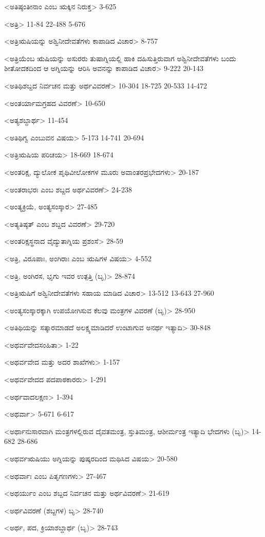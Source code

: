 <ಅತಿಷ್ಠಂತೀನಾಂ ಎಂಬ ಋಕ್ಕಿನ ನಿರುಕ್ತ>
3-625

<ಅತ್ರಿ>
11-84 
22-488 
5-676

<ಅತ್ರಿಋಷಿಯನ್ನು ಅಶ್ವಿನೀದೇವತೆಗಳು ಕಾಪಾಡಿದ ವಿಚಾರ>
8-757

<ಅತ್ರಿಯೆಂಬ ಋಷಿಯನ್ನು ಅಸುರರು ತುಷಾಗ್ನಿಯಲ್ಲಿ ಹಾಕಿ ದಹಿಸುತ್ತಿರುವಾಗ ಅಶ್ವಿನೀದೇವತೆಗಳು ಬಂದು ಶೀತೋದಕದಿಂದ ಆ ಅಗ್ನಿಯನ್ನು ಆರಿಸಿ ಅವನನ್ನು ಕಾಪಾಡಿದ ವಿಚಾರ>
9-222
20-143

<ಅತಿಥಿಶಬ್ದದ ನಿರ್ವಚನ ಮತ್ತು ಅರ್ಥವಿವರಣೆ>
10-304 
18-725 
20-533
14-472

<ಅಂತರ್ಯಾಮಗ್ರಹದ ವಿವರಣೆ>
10-650

<ಅತ್ಯಶಬ್ದಾರ್ಥ>
11-454

<ಅತಿಥಿಗ್ವ ಎಂಬುವನ ವಿಷಯ>
5-173 
14-741
20-694

<ಅತ್ರಿಋಷಿಯ ಪರಿಚಯ>
18-669
18-674

<ಅಂತರಿಕ್ಷ, ದ್ಯುಲೋಕ ಪೃಥಿವೀಲೋಕಗಳ ಮೂರು ಅವಾಂತರಪ್ರಭೇದಗಳು>
20-187

<ಅಂತರಾಭರಃ ಎಂಬ ಶಬ್ದದ ಅರ್ಥವಿವರಣೆ>
24-238

<ಅಂತ್ಯಕ್ರಿಯೆ, ಅಂತ್ಯಸಂಸ್ಕಾರ>
27-485

<ಅತ್ಯತಿಷ್ಠತ್‍ ಎಂಬ ಶಬ್ದದ ವಿವರಣೆ>
29-720

<ಅಂತರಿಕ್ಷಸ್ಥನಾದ ವೈದ್ಯುತಾಗ್ನಿಯ ಪ್ರಶಂಸೆ>
28-59

<ಅತ್ರಿ, ವಿರೂಪಾಃ, ಅಂಗಿರಾಃ ಎಂಬ ಋಷಿಗಳ ವಿಷಯ>
4-552

<ಅತ್ರಿ, ಅಂಗಿರಸ, ಭೃಗು ಇವರ ಉತ್ಪತ್ತಿ (ಬೃ)>
28-874

<ಅತ್ರಿಋಷಿಗೆ ಅಶ್ವಿನೀದೇವತೆಗಳು ಸಹಾಯ ಮಾಡಿದ ವಿಚಾರ>
13-512 
13-643
27-960

<ಅಂತ್ಯಸಂಸ್ಕಾರಕ್ಕಾಗಿ ಉಪಯೋಗಿಸುವ ಕೆಲವು ಮಂತ್ರಗಳ ವಿವರಣೆ (ಬೃ)>
28-950

<ಅತಿಥಿಯನ್ನು ಸತ್ಕಾರಮಾಡದೆ ಅಲಕ್ಷ್ಯಮಾಡಿದರೆ ಉಂಟಾಗುವ ಅನರ್ಥ ಇತ್ಯಾದಿ>
30-848

<ಅಥರ್ವವೇದಸಂಹಿತಾ>
1-22

<ಅಥರ್ವವೇದ ಮತ್ತು ಅದರ ಶಾಖೆಗಳು>
1-157

<ಅಥರ್ವವೇದದ ಪದಪಾಠಕಾರರು>
1-291

<ಅರ್ಥವಾದಲಕ್ಷಣ>
1-394

<ಅಥರ್ವಾ>
5-671
6-617


<ಅರ್ಥಾನುಸಾರವಾಗಿ ಮಂತ್ರಗಳಲ್ಲಿರುವ ದೈವತಮಂತ್ರ, ಸ್ತುತಿಮಂತ್ರ, ಆಶೀರ್ಮಂತ್ರ ಇತ್ಯಾದಿ ಭೇದಗಳು (ಬೃ)>
14-682
28-686

<ಅಥರ್ವಋಷಿಯು ಅಗ್ನಿಯನ್ನು ಪುಷ್ಕರದಿಂದ ಮಥಿಸಿದ ವಿಷಯ>
20-580

<ಅಥರ್ವಾಃ ಎಂಬ ಪಿತೃಗಣಗಳು>
27-467

<ಅಥರ್ಯುಂ ಎಂಬ ಶಬ್ದದ ನಿರ್ವಚನ ಮತ್ತು ಅರ್ಥವಿವರಣೆ>
21-619

<ಅರ್ಥವಿವರಣೆ (ಶಬ್ದಗಳ) ಬೃ>
28-740

<ಅರ್ಥ, ಪದ, ಕ್ರಿಯಾಶಬ್ದಾರ್ಥ (ಬೃ)>
28-743

